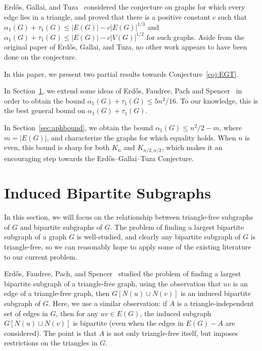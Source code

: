 \documentclass{amsart}
\newcommand{\sizeof}[1]{\left\lvert{#1}\right\rvert}
\newcommand{\aph}{\alpha_1}
\let\oldtau\tau
\renewcommand{\tau}{\oldtau_1}
\theoremstyle{definition}
\theoremstyle{remark}
\begin{document}
Erd\H os, Gallai, and Tuza~\cite{EGT} considered the conjecture on
graphs for which every edge lies in a triangle, and proved that there
is a positive constant $c$ such that $\aph(G) + \tau(G) \leq
\sizeof{E(G)} - c\sizeof{E(G)}^{1/3}$ and $\aph(G) + \tau(G) \leq
\sizeof{E(G)} - c\sizeof{V(G)}^{1/2}$ for such graphs. Aside from the
original paper of Erd\H os, Gallai, and Tuza, no other work appears to
have been done on the conjecture.

In this paper, we present two partial results towards
Conjecture~\ref{coj:EGT}.

In Section~\ref{sec:indbip}, we extend some ideas of Erd\H os,
Faudree, Pach and Spencer~\cite{howbip} in order to obtain the bound
$\aph(G) + \tau(G) \leq 5n^2/16$. To our knowledge, this is the best
general bound on $\aph(G) + \tau(G)$.

In Section~\ref{sec:aphbound}, we obtain the bound $\aph(G) \leq n^2/2
- m$, where $m = \sizeof{E(G)}$, and characterize the graphs for which
equality holds. When $n$ is even, this bound is sharp for both $K_n$
and $K_{n/2,n/2}$, which makes it an encouraging step towards the
Erd\H os--Gallai--Tuza Conjecture.

\section{Induced Bipartite Subgraphs}\label{sec:indbip}
In this section, we will focus on the relationship between
triangle-free subgraphs of $G$ and bipartite subgraphs of $G$.  The
problem of finding a largest bipartite subgraph of a graph $G$ is
well-studied, and clearly any bipartite subgraph of $G$ is
triangle-free, so we can reasonably hope to apply some of the existing
literature to our current problem.

Erd\H os, Faudree, Pach, and Spencer~\cite{howbip} studied the problem
of finding a largest bipartite subgraph of a triangle-free graph,
using the observation that $uv$ is an edge of a triangle-free graph,
then $G[N(u) \cup N(v)]$ is an induced bipartite subgraph of
$G$. Here, we use a similar observation: if $A$ is a
triangle-independent set of edges in $G$, then for any $uv \in E(G)$,
the induced subgraph $G[N(u) \cup N(v)]$ is bipartite (even when the
edges in $E(G) - A$ are considered). The point is that $A$ is not
only triangle-free itself, but imposes restrictions on the triangles
in $G$.
\end{document}
